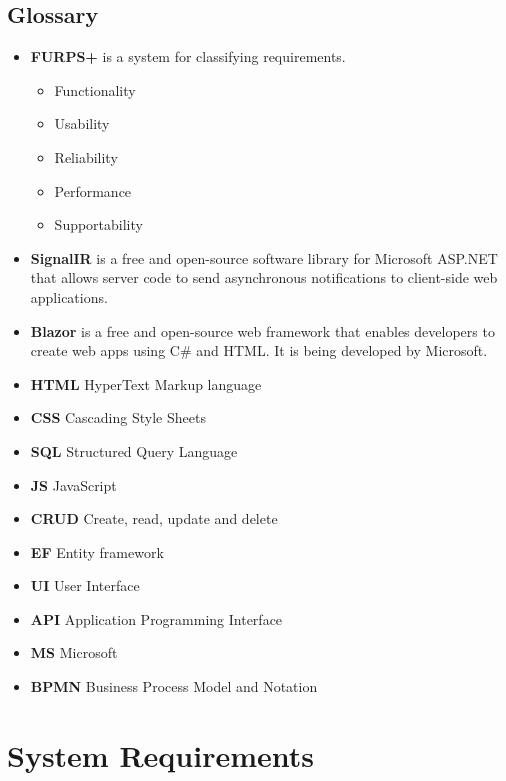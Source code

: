 \documentclass{scrartcl}
\begin{document}
	
\subsection{Glossary}
\begin{itemize}


\item \textbf{FURPS+}\cite{eeles2005capturing} is a system for classifying requirements.
\begin{itemize}
\item Functionality
\item Usability
\item Reliability
\item Performance
\item Supportability 
\end{itemize}


\item \textbf{ SignalIR} is a free and open-source software library for Microsoft ASP.NET that allows server code to send asynchronous notifications to client-side web applications. 

\item \textbf{Blazor} is a free and open-source web framework that enables developers to create web apps using C\# and HTML. It is being developed by Microsoft.

\item \textbf{HTML} HyperText Markup language

\item \textbf{CSS} Cascading Style Sheets
\item \textbf{SQL} Structured Query Language
\item \textbf{JS } JavaScript
\item \textbf{CRUD} Create, read, update and delete
\item \textbf{EF} Entity framework
\item \textbf{UI} User Interface
\item \textbf{API} Application Programming Interface 

\item \textbf{MS} Microsoft
\item \textbf{BPMN} Business Process Model and Notation



\end{itemize}
\section{System Requirements}
\end{document}
